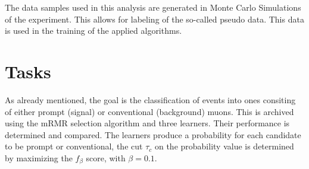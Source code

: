 The data samples used in this analysis are generated in Monte Carlo Simulations of the experiment. This allows for labeling of the so-called pseudo data. This data is used in the training of the applied algorithms.

\section{Tasks}
\label{sec:Tasks}

As already mentioned, the goal is the classification of events into ones consiting of either prompt (signal) or conventional (background) muons. This is archived using the mRMR selection algorithm and three learners. Their performance is determined and compared. The learners produce a probability for each candidate to be prompt or conventional, the cut $\tau_c$ on the probability value is determined by maximizing the $f_\beta$ score, with $\beta=0.1$. 